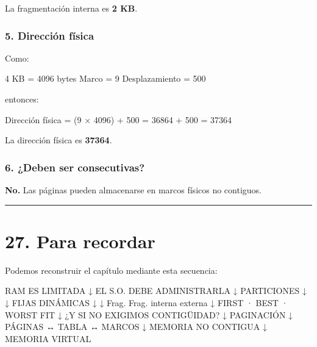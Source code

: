 \documentclass[
  spanish,
  letterpaper,
]{scrbook}
\newenvironment{Shaded}{\begin{snugshade}}{\end{snugshade}}
\newcommand{\NormalTok}[1]{\textcolor[rgb]{0.00,0.23,0.31}{#1}}
\begin{document}
\begin{tcolorbox}
La fragmentación interna es \textbf{2 KB}.

\subsection{5. Dirección física}\label{direcciuxf3n-fuxedsica}

Como:

\begin{Shaded}
\begin{Highlighting}[]
\NormalTok{4 KB = 4096 bytes}
\NormalTok{Marco = 9}
\NormalTok{Desplazamiento = 500}
\end{Highlighting}
\end{Shaded}

entonces:

\begin{Shaded}
\begin{Highlighting}[]
\NormalTok{Dirección física = (9 × 4096) + 500}
\NormalTok{                  = 36864 + 500}
\NormalTok{                  = 37364}
\end{Highlighting}
\end{Shaded}

La dirección física es \textbf{37364}.

\subsection{6. ¿Deben ser consecutivas?}\label{deben-ser-consecutivas}

\textbf{No.} Las páginas pueden almacenarse en marcos físicos no
contiguos.

\end{tcolorbox}

\begin{center}\rule{0.5\linewidth}{0.5pt}\end{center}


\chapter{27. Para recordar}\label{para-recordar-4}

Podemos reconstruir el capítulo mediante esta secuencia:

\begin{Shaded}
\begin{Highlighting}[]
\NormalTok{RAM ES LIMITADA}
\NormalTok{      ↓}
\NormalTok{EL S.O. DEBE ADMINISTRARLA}
\NormalTok{      ↓}
\NormalTok{PARTICIONES}
\NormalTok{  ↓            ↓}
\NormalTok{FIJAS       DINÁMICAS}
\NormalTok{  ↓            ↓}
\NormalTok{Frag.       Frag.}
\NormalTok{interna     externa}
\NormalTok{      ↓}
\NormalTok{FIRST · BEST · WORST FIT}
\NormalTok{      ↓}
\NormalTok{¿Y SI NO EXIGIMOS CONTIGÜIDAD?}
\NormalTok{      ↓}
\NormalTok{PAGINACIÓN}
\NormalTok{      ↓}
\NormalTok{PÁGINAS ↔ TABLA ↔ MARCOS}
\NormalTok{      ↓}
\NormalTok{MEMORIA NO CONTIGUA}
\NormalTok{      ↓}
\NormalTok{MEMORIA VIRTUAL}
\end{Highlighting}
\end{Shaded}
\end{document}

